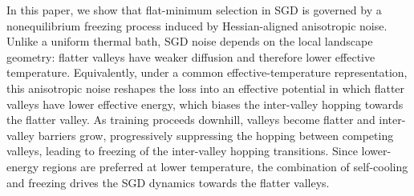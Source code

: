 \documentclass[aps,prx,reprint,superscriptaddress,longbibliography,nofootinbib,floatfix]{revtex4-2}
\begin{document}

In this paper, we show that flat-minimum selection in SGD is governed by a nonequilibrium freezing process induced by Hessian-aligned anisotropic noise. Unlike a uniform thermal bath, SGD noise depends on the local landscape geometry: flatter valleys have weaker diffusion and therefore lower effective temperature. Equivalently, under a common effective-temperature representation, this anisotropic noise reshapes the loss into an effective potential in which flatter valleys have lower effective energy, which biases the inter-valley hopping towards the flatter valley. As training proceeds downhill, valleys become flatter and inter-valley barriers grow, progressively suppressing the hopping between competing valleys, leading to freezing of the inter-valley hopping transitions. Since lower-energy regions are preferred at lower temperature, the combination of self-cooling and freezing drives the SGD dynamics towards the flatter valleys. 

\end{document}
